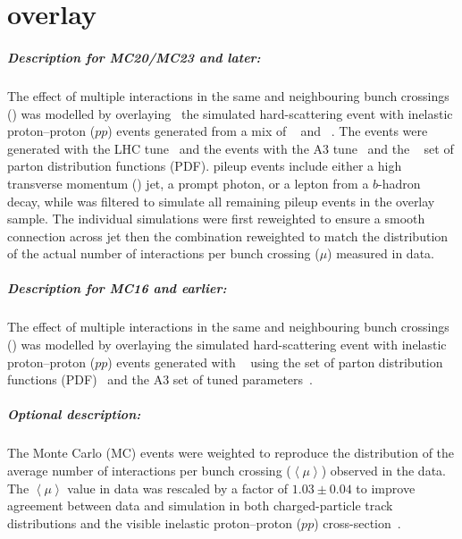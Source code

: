 \chapter{\Pileup overlay}

\paragraph{Description for MC20/MC23 and later:}

The effect of multiple interactions in the same and neighbouring bunch crossings (\pileup) 
was modelled by overlaying~\cite{SIMU-2020-01} the simulated hard-scattering event 
with inelastic proton--proton (\(pp\)) events generated from a mix of 
\EPOS[2.0.1.4]~\cite{Werner:2005jf} and \PYTHIA[8.308]~\cite{Bierlich:2022pfr}.
The \EPOS events were generated with the \EPOS LHC tune~\cite{Pierog:2013ria} 
and the \PYTHIA events with the A3 tune~\cite{ATL-PHYS-PUB-2016-017} 
and the \NNPDF[2.3lo]~\cite{Ball:2012cx} set of parton distribution functions (PDF).
\PYTHIA pileup events include either a high transverse momentum (\pt) jet, 
a prompt photon, or a lepton from a $b$-hadron decay, 
while \EPOS was filtered to simulate all remaining pileup events in the overlay sample.
The individual simulations were first reweighted to ensure a smooth connection across jet \pt then
the combination reweighted to match the distribution of the actual number of interactions per bunch crossing (\(\mu\)) measured in data.

\paragraph{Description for MC16 and earlier:}

The effect of multiple interactions in the same and neighbouring bunch
crossings (\pileup) was modelled by overlaying the simulated hard-scattering event with
inelastic proton--proton (\(pp\)) events generated with \PYTHIA[8.186]~\cite{Sjostrand:2007gs}
using the \NNPDF[2.3lo] set of parton distribution functions (PDF)~\cite{Ball:2012cx} and the
A3 set of tuned parameters~\cite{ATL-PHYS-PUB-2016-017}.

\paragraph{Optional description:}

The Monte Carlo (MC) events were weighted to reproduce the
distribution of the average number of interactions per bunch crossing
(\(\left<\mu \right>\)) observed in the data. The \(\left<\mu \right>\)
value in data was rescaled by a factor of \(1.03\pm 0.04\) to improve
agreement between data and simulation in both charged-particle track distributions and 
the visible inelastic proton--proton (\(pp\)) cross-section~\cite{STDM-2015-05}.
